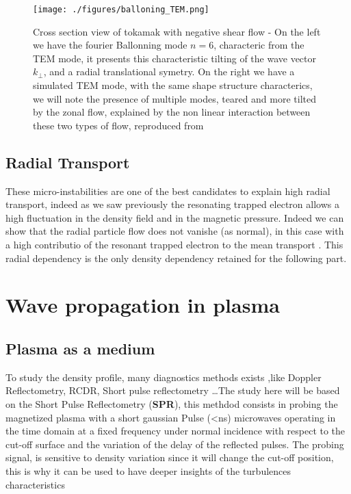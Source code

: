 \documentclass[11pt,a4paper,openany]{report}
\begin{document}
\begin{figure}[H]
    \centering
    \texttt{[image: ./figures/balloning\_TEM.png]}
    \caption{Cross section view of tokamak with negative shear flow - On the left we have the fourier Ballonning mode $n = 6$, characteric from the TEM mode, it presents this characteristic tilting of the wave vector $k_{\perp}$, and a radial translational symetry. On the right we have a simulated TEM mode, with the same shape structure characterics, we will note the presence of multiple modes, teared and more tilted by the zonal flow, explained by the non linear interaction between these two types of flow, reproduced from \cite{TEM_simulation,Ballooning_transform} }
    \label{}
\end{figure}
\begin{multicols}{2}
    \subsection{Radial Transport}
    These micro-instabilities are one of the best candidates to explain high radial transport, indeed as we saw previously the resonating trapped electron allows a high fluctuation in the density field and in the magnetic pressure. Indeed we can show that the radial particle flow does not vanishe (as normal), in this case with a high contributio of the resonant trapped electron to the mean transport \cite{San_diego}. This radial dependency is the only density dependency retained for the following part.

    \section{Wave propagation in plasma}
    \subsection{Plasma as a medium}
    To study the density profile, many diagnostics methods exists ,like Doppler Reflectometry, RCDR, Short pulse reflectometry \dots The study here will be based on the Short Pulse Reflectometry (\textbf{SPR}), this methdod consists in probing the magnetized plasma with a short gaussian Pulse (<ns) microwaves operating in the time domain at a fixed frequency under normal incidence with respect to the cut-off surface and the variation of the delay of the reflected pulses. The probing signal, is sensitive to density variation since it will change the cut-off position, this is why it can
    be used to have deeper insights of the turbulences characteristics

\end{multicols}
\end{document}
